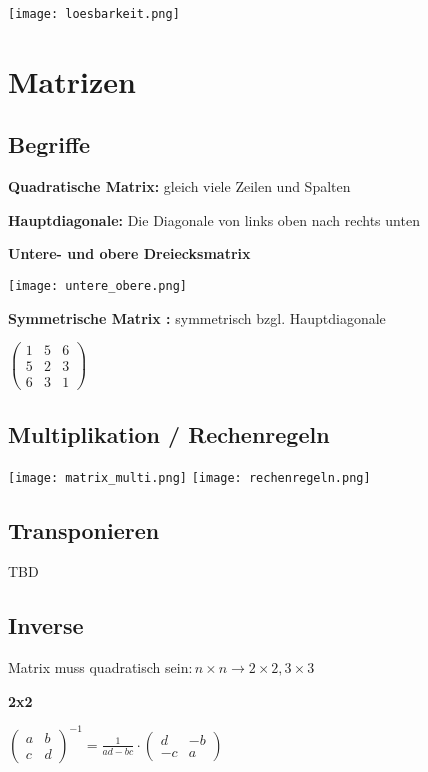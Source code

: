 \begin{multicols*}{3}
 \texttt{[image: loesbarkeit.png]}

\section{Matrizen}
\subsection{Begriffe}

\textbf{Quadratische Matrix:} gleich viele Zeilen und Spalten  

\textbf{Hauptdiagonale:} Die Diagonale von links oben nach rechts unten  

\textbf{Untere- und obere Dreiecksmatrix}  

\texttt{[image: untere\_obere.png]} 

\textbf{Symmetrische Matrix :} symmetrisch bzgl. Hauptdiagonale 

$ \begin{pmatrix}
1 & 5 & 6\\
5 & 2 & 3\\
6 & 3 & 1
\end{pmatrix} $

\WhiteSpace
\subsection{Multiplikation / Rechenregeln}
{\begin{multicols}{2}
{ \texttt{[image: matrix\_multi.png]} }
\columnbreak
{ \texttt{[image: rechenregeln.png]} }
\end{multicols}}

\subsection{Transponieren}

TBD

\subsection{Inverse}
{Matrix muss quadratisch sein$: n \times n \rightarrow 2\times2, 3\times3$} 

\textbf{2x2} 

{\large$\begin{pmatrix}
a & b\\
c & d
\end{pmatrix}^{-1} = \frac{1}{ad-bc}\cdot\begin{pmatrix}
d & -b\\
-c & a
\end{pmatrix}$}


\end{multicols*}
